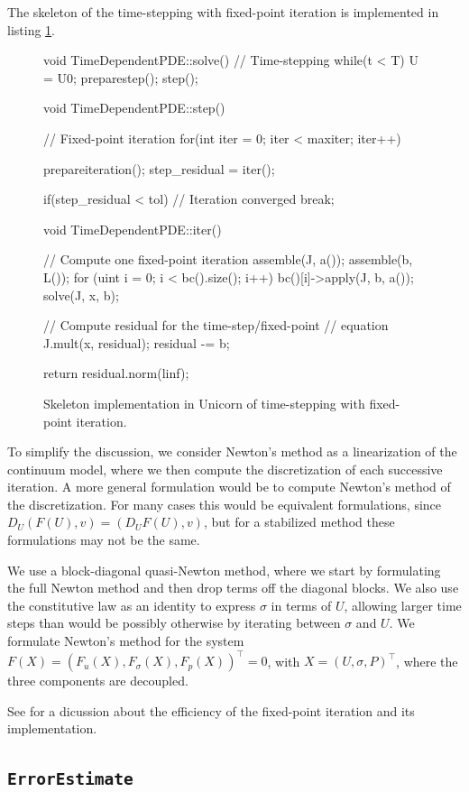 The skeleton of the time-stepping with fixed-point iteration is
implemented in listing \ref{code:time-stepping}.


\begin{figure}[!h]
{\small
\begin{c++}
void TimeDependentPDE::solve()
{
  // Time-stepping
  while(t < T)
  {
    U = U0;
    preparestep();
    step();
  }
}

void TimeDependentPDE::step()
{
  // Fixed-point iteration
  for(int iter = 0; iter < maxiter; iter++)
  {
    prepareiteration();
    step_residual = iter();

    if(step_residual < tol)
    {
      // Iteration converged
      break;
    }
  }
}

void TimeDependentPDE::iter()
{
  // Compute one fixed-point iteration
  assemble(J, a());
  assemble(b, L());
  for (uint i = 0; i < bc().size(); i++)
    bc()[i]->apply(J, b, a());
  solve(J, x, b);

  // Compute residual for the time-step/fixed-point
  // equation
  J.mult(x, residual);
  residual -= b;

  return residual.norm(linf);
}
\end{c++}
}
\label{code:time-stepping}
\caption{
Skeleton implementation in Unicorn of time-stepping with fixed-point
iteration.}
\end{figure}

To simplify the discussion, we consider Newton's method as a
linearization of the continuum model, where we then compute the
discretization of each successive iteration. A more general
formulation would be to compute Newton's method of the
discretization. For many cases this would be equivalent formulations,
since $D_U (F(U), v) = (D_U F(U), v)$, but for a stabilized method
these formulations may not be the same.

We use a block-diagonal quasi-Newton method, where we start by
formulating the full Newton method and then drop terms off the
diagonal blocks. We also use the constitutive law as an identity to
express $\sigma$ in terms of $U$, allowing larger time steps than
would be possibly otherwise by iterating between $\sigma$ and $U$. We
formulate Newton's method for the system $F(X) = (F_u(X), F_\sigma(X),
F_p(X))^\top = 0$, with $X = (U, \sigma, P)^\top$, where the three
components are decoupled.

See \citet{Jansson2009} for a dicussion about
the efficiency of the fixed-point iteration and its implementation.

\subsection{\tt ErrorEstimate}

